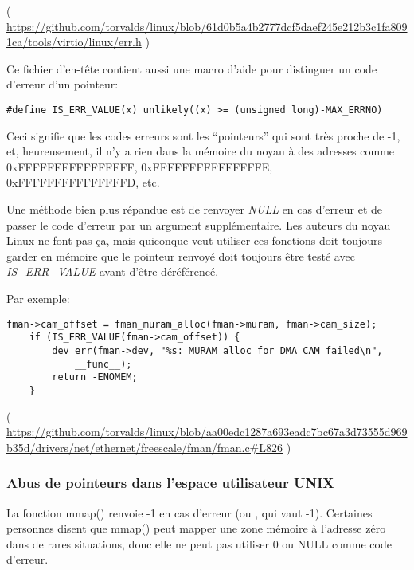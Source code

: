 ( \url{https://github.com/torvalds/linux/blob/61d0b5a4b2777dcf5daef245e212b3c1fa8091ca/tools/virtio/linux/err.h} )

Ce fichier d'en-tête contient aussi une macro d'aide pour distinguer un code d'erreur
d'un pointeur:

\begin{lstlisting}[style=customc]
#define IS_ERR_VALUE(x) unlikely((x) >= (unsigned long)-MAX_ERRNO)
\end{lstlisting}

Ceci signifie que les codes erreurs sont les ``pointeurs'' qui sont très proche de
-1, et, heureusement, il n'y a rien dans la mémoire du noyau à des adresses comme
0xFFFFFFFFFFFFFFFF, 0xFFFFFFFFFFFFFFFE, 0xFFFFFFFFFFFFFFFD, etc.

Une méthode bien plus répandue est de renvoyer \emph{NULL} en cas d'erreur et de passer
le code d'erreur par un argument supplémentaire.
Les auteurs du noyau Linux ne font pas ça, mais quiconque veut utiliser ces fonctions
doit toujours garder en mémoire que le pointeur renvoyé doit toujours être testé avec
\emph{IS\_ERR\_VALUE} avant d'être déréférencé.

Par exemple:

\begin{lstlisting}[style=customc]
	fman->cam_offset = fman_muram_alloc(fman->muram, fman->cam_size);
	if (IS_ERR_VALUE(fman->cam_offset)) {
		dev_err(fman->dev, "%s: MURAM alloc for DMA CAM failed\n",
			__func__);
		return -ENOMEM;
	}
\end{lstlisting}

( \url{https://github.com/torvalds/linux/blob/aa00edc1287a693eadc7bc67a3d73555d969b35d/drivers/net/ethernet/freescale/fman/fman.c#L826} )

\subsubsection{Abus de pointeurs dans l'espace utilisateur UNIX}

La fonction mmap() renvoie -1 en cas d'erreur (ou , qui vaut -1).
Certaines personnes disent que mmap() peut mapper une zone mémoire à l'adresse zéro
dans de rares situations, donc elle ne peut pas utiliser 0 ou NULL comme code d'erreur.

